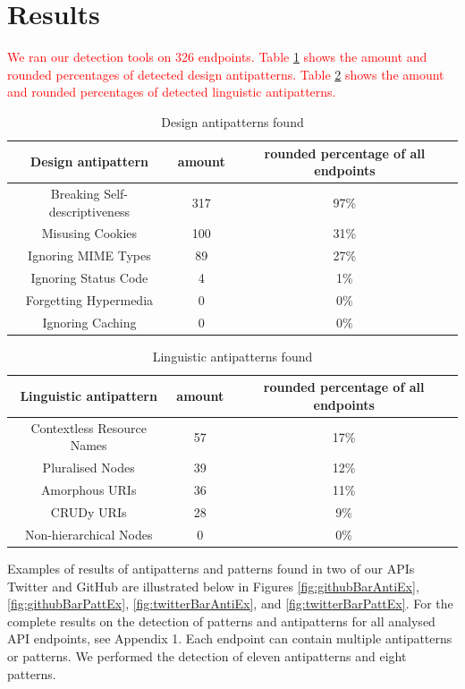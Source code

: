 \section{Results}

\textcolor{red}{We ran our detection tools on 326 endpoints. Table \ref{tab:Design antipatterns found} shows the amount and rounded percentages of detected design antipatterns. Table \ref{tab:Linguistic antipatterns found} shows the amount and rounded percentages of detected linguistic antipatterns.}

\begin{table}[htb!]
    \centering
    \begin{tabular}{|c|c|c|} \hline
       Design antipattern & amount & rounded percentage of all endpoints \\ \hline
        Breaking Self-descriptiveness & 317 & 97\%  \\ \hline
        Misusing Cookies & 100 & 31\%  \\ \hline
        Ignoring MIME Types & 89 & 27\%  \\ \hline
        Ignoring Status Code & 4 & 1\%  \\ \hline
        Forgetting Hypermedia & 0 & 0\%  \\ \hline
        Ignoring Caching & 0 & 0\%  \\ \hline
    \end{tabular}
    \caption{Design antipatterns found}
    \label{tab:Design antipatterns found}
\end{table}

\begin{table}[htb!]
    \centering
    \begin{tabular}{|c|c|c|} \hline
        Linguistic antipattern & amount & rounded percentage of all endpoints  \\ \hline
        Contextless Resource Names & 57 & 17\%  \\ \hline
        Pluralised Nodes & 39 & 12\% \\ \hline
        Amorphous URIs & 36 & 11\% \\ \hline
        CRUDy URIs & 28 & 9\% \\ \hline
        Non-hierarchical Nodes & 0 & 0\% \\ \hline
    \end{tabular}
    \caption{Linguistic antipatterns found}
    \label{tab:Linguistic antipatterns found}
\end{table}

Examples of results of antipatterns and patterns found in two of our APIs Twitter and GitHub are illustrated below in Figures \ref{fig:githubBarAntiEx}, \ref{fig:githubBarPattEx}, \ref{fig:twitterBarAntiEx}, and \ref{fig:twitterBarPattEx}. For the complete results on the detection of patterns and antipatterns for all analysed API endpoints, see Appendix 1. Each endpoint can contain multiple antipatterns or patterns. We performed the detection of eleven antipatterns and eight patterns.

